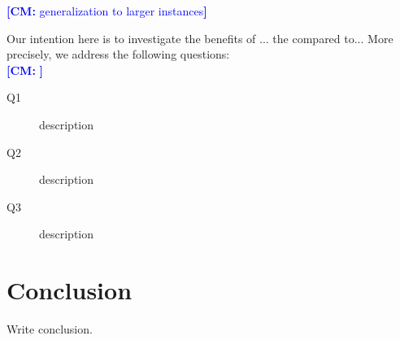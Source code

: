 \documentclass[11pt, DIV=12]{scrartcl}
\theoremstyle{definition}
\newcommand{\cm}[1]{{{\textcolor{blue}{\textbf{[CM:} {#1}\textbf{]}}}}}
\begin{document}
\cm{generalization to larger instances}

Our intention here is to investigate the benefits of ... the compared to...
More precisely, we address the following questions:\\

\cm{}
\begin{description}
	\item[Q1] description
	\item[Q2] description
	\item[Q3] description
\end{description}

\section{Conclusion}
Write conclusion.			

 

	
\end{document}
